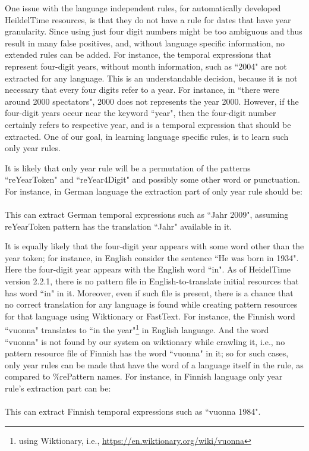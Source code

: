 One issue with the language independent rules, for automatically developed HeildelTime resources, is that they do not have a rule for dates that have year granularity. Since using just four digit numbers might be too ambiguous and thus result in many false positives, and, without language specific information, no extended rules can be added. For instance, the temporal expressions that represent four-digit years, without month information, such as ``2004" are not extracted for any language. This is an understandable decision, because it is not necessary that every four digits refer to a year. For instance, in ``there were around 2000 spectators", 2000 does not represents the year 2000. However, if the four-digit years occur near the keyword ``year", then the four-digit number certainly refers to respective year, and is a temporal expression that should be extracted. One of our goal, in learning language specific rules, is to learn such only year rules. 

It is likely that only year rule will be a permutation of the patterns ``reYearToken" and ``reYear4Digit" and possibly some other word or punctuation. For instance, in German language the extraction part of only year rule should be:\\
\\
This can extract German temporal expressions such as ``Jahr 2009", assuming reYearToken pattern has the translation ``Jahr" available in it. 

It is equally likely that the four-digit year appears with some word other than the year token; for instance, in English consider the sentence ``He was born in 1934". Here the four-digit year appears with the English word ``in". As of HeidelTime version 2.2.1, there is no pattern file in English-to-translate initial resources that has word ``in" in it. Moreover, even if such file is present, there is a chance that no correct translation for any language is found while creating pattern resources for that language using Wiktionary or FastText. For instance, the Finnish word ``vuonna" translates to ``in the year"\footnote{using Wiktionary, i.e., \url{https://en.wiktionary.org/wiki/vuonna}} in English language. And the word ``vuonna" is not found by our system on wiktionary while crawling it, i.e., no pattern resource file of Finnish has the word ``vuonna" in it; so for such cases, only year rules can be made that have the word of a language itself in the rule, as compared to \%rePattern names. For instance, in Finnish language only year rule's extraction part can be:\\
\\
This can extract Finnish temporal expressions such as ``vuonna 1984".

